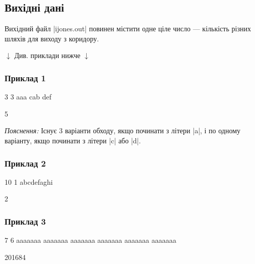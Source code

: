 \documentclass[12pt,a4paper]{article}
\begin{document}
\subsection*{Вихідні дані}

Вихідний файл |ijones.out| повинен містити одне ціле число --- кількість різних шляхів для виходу з коридору.


\begin{pagebottomtext}
$\downarrow$ Див. приклади нижче $\downarrow$
\end{pagebottomtext}


\pagebreak


\subsubsection*{Приклад 1}

\textbf{}

\begin{codeblock}
3 3
aaa
cab
def
\end{codeblock}

\textbf{}

\begin{codeblock}
5
\end{codeblock}

\emph{Пояснення:} Існує 3 варіанти обходу, якщо починати з літери |a|, і по одному варіанту, якщо починати з літери |c| або |d|.


\subsubsection*{Приклад 2}

\textbf{}

\begin{codeblock}
10 1
abcdefaghi
\end{codeblock}

\textbf{}

\begin{codeblock}
2
\end{codeblock}


\subsubsection*{Приклад 3}

\textbf{}

\begin{codeblock}
7 6
aaaaaaa
aaaaaaa
aaaaaaa
aaaaaaa
aaaaaaa
aaaaaaa
\end{codeblock}

\textbf{}

\begin{codeblock}
201684
\end{codeblock}
\end{document}
